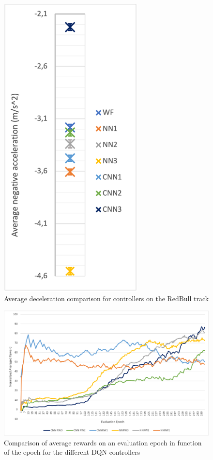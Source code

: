 \begin{figure}
\begin{minipage}{0.45\textwidth}
        \includegraphics[width=0.65\textwidth]{Figures/H1_decel.png}
        \caption{Average deceleration comparison for controllers on the RedBull track}
        \label{h1_decel}
    \end{minipage}
\end{figure}

\begin{figure}
	\centering
	\includegraphics[scale=0.65]{Figures/eval_score.png}
	\caption{Comparison of average rewards on an evaluation epoch in function of the epoch for the different DQN controllers}
	\label{comparison_eval}
\end{figure}


